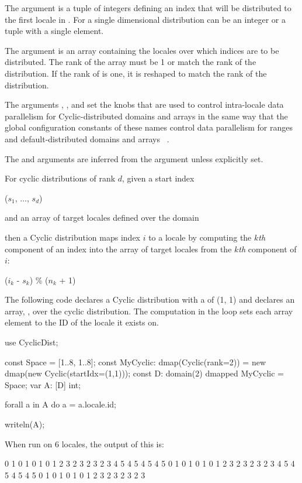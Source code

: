 The argument  is a tuple of integers defining an index that
will be distributed to the first locale in . For a single
dimensional distribution  can be an integer or a tuple with a
single element.

The argument  is an array containing the locales over
which indices are to be distributed.  The rank of the  array
must be 1 or match the rank of the distribution. If the rank of  is one, it is reshaped to match the rank of the distribution.

The arguments , ,
and  set the knobs that are used to control
intra-locale data parallelism for Cyclic-distributed domains and arrays in
the same way that the global configuration constants of these names control
data parallelism for ranges and default-distributed domains and arrays
~.

The  and  arguments are inferred from the
 argument unless explicitly set.

For cyclic distributions of rank $d$, given a start index

\begin{chapel}
($s_1$, $\ldots$, $s_d$)
\end{chapel}

and an array of target locales defined over the domain

\begin{chapel}
[$0$..$n_1$, $\ldots$, $0$..$n_d$]
\end{chapel}

then a Cyclic distribution maps index $i$ to a locale by computing
the $k$\emph{th} component of an index into the array of target locales
from the $k$\emph{th} component of $i$:

($i_k$ - $s_k$) \% ($n_k$ + 1)

\begin{example}
The following code declares a Cyclic distribution with a  of
(1, 1) and declares an array, , over the cyclic distribution. The
computation in the  loop sets each array element to the ID of the
locale it exists on.
\begin{chapel}
use CyclicDist;

const Space = [1..8, 1..8];
const MyCyclic: dmap(Cyclic(rank=2)) = new dmap(new Cyclic(startIdx=(1,1)));
const D: domain(2) dmapped MyCyclic = Space;
var A: [D] int;

forall a in A do
  a = a.locale.id;

writeln(A);
\end{chapel}
When run on 6 locales, the output of this is:
\begin{chapel}
0 1 0 1 0 1 0 1
2 3 2 3 2 3 2 3
4 5 4 5 4 5 4 5
0 1 0 1 0 1 0 1
2 3 2 3 2 3 2 3
4 5 4 5 4 5 4 5
0 1 0 1 0 1 0 1
2 3 2 3 2 3 2 3
\end{chapel}
\end{example}
